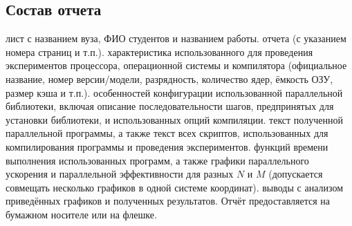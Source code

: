 { %
	\subsection{Состав отчета}
	\begin{enumerate}
		 лист с названием вуза, ФИО студентов и названием работы.
		 отчета (с указанием номера страниц и т.п.).
		 характеристика использованного для проведения экспериментов процессора, операционной системы и компилятора (официальное название, номер версии/модели, разрядность, количество ядер, ёмкость ОЗУ, размер кэша и т.п.).
		 особенностей конфигурации использованной параллельной библиотеки, включая описание последовательности шагов, предпринятых для установки библиотеки, и использованных опций компиляции.
		 текст полученной параллельной программы, а также текст всех скриптов, использованных для компилирования программы и проведения экспериментов.
		 функций времени выполнения использованных программ, а также графики параллельного ускорения и параллельной эффективности для разных $N$ и $M$ (допускается совмещать несколько графиков в одной системе координат).
		 выводы с анализом приведённых графиков и полученных результатов. Отчёт предоставляется на бумажном носителе или на флешке.
	\end{enumerate}
}